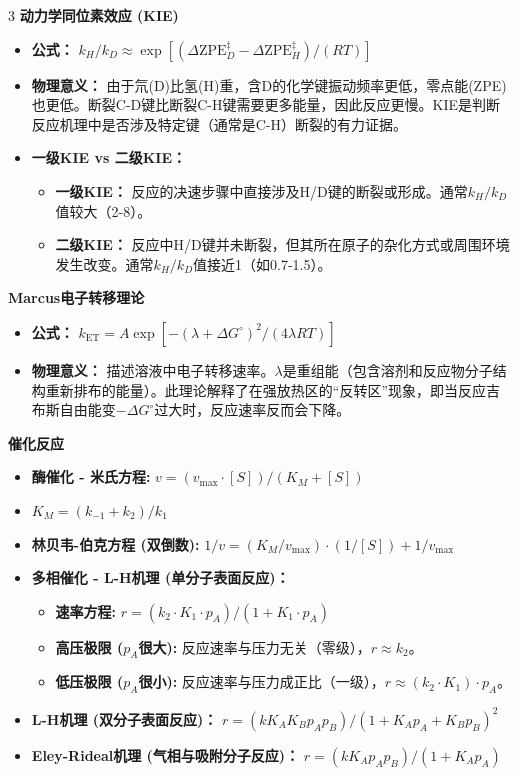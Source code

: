 \documentclass[a4paper,6pt]{article} %
\begin{document}
\begin{multicols}{3}
\textbf{动力学同位素效应 (KIE)}
\begin{itemize}
    \item \textbf{公式：} $k_H / k_D \approx \exp[(\Delta\text{ZPE}_D^\ddagger - \Delta\text{ZPE}_H^\ddagger)/(RT)]$
    \item \textbf{物理意义：} 由于氘(D)比氢(H)重，含D的化学键振动频率更低，零点能(ZPE)也更低。断裂C-D键比断裂C-H键需要更多能量，因此反应更慢。KIE是判断反应机理中是否涉及特定键（通常是C-H）断裂的有力证据。
    \item \textbf{一级KIE vs 二级KIE：}
    \begin{itemize}
        \item \textbf{一级KIE：} 反应的决速步骤中直接涉及H/D键的断裂或形成。通常$k_H/k_D$值较大（2-8）。
        \item \textbf{二级KIE：} 反应中H/D键并未断裂，但其所在原子的杂化方式或周围环境发生改变。通常$k_H/k_D$值接近1（如0.7-1.5）。
    \end{itemize}
\end{itemize}

\textbf{Marcus电子转移理论}
\begin{itemize}
    \item \textbf{公式：} $k_{\text{ET}} = A \exp[-(\lambda + \Delta G^\circ)^2 / (4\lambda RT)]$
    \item \textbf{物理意义：} 描述溶液中电子转移速率。$\lambda$是重组能（包含溶剂和反应物分子结构重新排布的能量）。此理论解释了在强放热区的“反转区”现象，即当反应吉布斯自由能变$-\Delta G^\circ$过大时，反应速率反而会下降。
\end{itemize}

\textbf{催化反应}
\begin{itemize}
    \item \textbf{酶催化 - 米氏方程:} $v = (v_{\text{max}} \cdot [S]) / (K_M + [S])$
    \item $K_M = (k_{-1}+ k_2) / k_1$
    \item \textbf{林贝韦-伯克方程 (双倒数):} $1/v = (K_M / v_{\text{max}}) \cdot (1/[S]) + 1/v_{\text{max}}$
    \item \textbf{多相催化 - L-H机理 (单分子表面反应)：}
    \begin{itemize}
        \item \textbf{速率方程:} $r = (k_2 \cdot K_1 \cdot p_A) / (1 + K_1 \cdot p_A)$
        \item \textbf{高压极限 ($p_A$很大):} 反应速率与压力无关（零级），$r \approx k_2$。
        \item \textbf{低压极限 ($p_A$很小):} 反应速率与压力成正比（一级），$r \approx (k_2 \cdot K_1) \cdot p_A$。
    \end{itemize}
    \item \textbf{L-H机理 (双分子表面反应)：} $r = (k K_A K_B p_A p_B) / (1 + K_A p_A + K_B p_B)^2$
    \item \textbf{Eley-Rideal机理 (气相与吸附分子反应)：} $r = (k K_A p_A p_B) / (1 + K_A p_A)$
\end{itemize}


\end{multicols}
\end{document}
